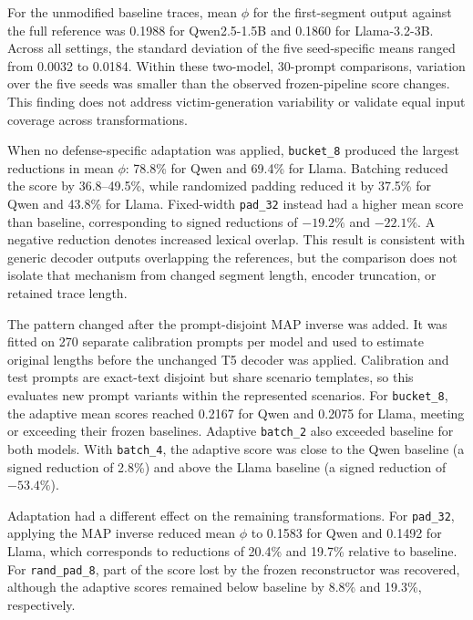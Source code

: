 \documentclass[electronics,article,submit,pdftex,moreauthors]{Definitions/mdpi}
\begin{document}
For the unmodified baseline traces, mean $\phi$ for the first-segment output against the full reference was 0.1988 for Qwen2.5-1.5B and 0.1860 for Llama-3.2-3B. Across all settings, the standard deviation of the five seed-specific means ranged from 0.0032 to 0.0184. Within these two-model, 30-prompt comparisons, variation over the five seeds was smaller than the observed frozen-pipeline score changes. This finding does not address victim-generation variability or validate equal input coverage across transformations.

When no defense-specific adaptation was applied, \texttt{bucket\_8} produced the largest reductions in mean $\phi$: 78.8\% for Qwen and 69.4\% for Llama. Batching reduced the score by 36.8--49.5\%, while randomized padding reduced it by 37.5\% for Qwen and 43.8\% for Llama. Fixed-width \texttt{pad\_32} instead had a higher mean score than baseline, corresponding to signed reductions of $-19.2\%$ and $-22.1\%$. A negative reduction denotes increased lexical overlap. This result is consistent with generic decoder outputs overlapping the references, but the comparison does not isolate that mechanism from changed segment length, encoder truncation, or retained trace length.

The pattern changed after the prompt-disjoint MAP inverse was added. It was fitted on 270 separate calibration prompts per model and used to estimate original lengths before the unchanged T5 decoder was applied. Calibration and test prompts are exact-text disjoint but share scenario templates, so this evaluates new prompt variants within the represented scenarios. For \texttt{bucket\_8}, the adaptive mean scores reached 0.2167 for Qwen and 0.2075 for Llama, meeting or exceeding their frozen baselines. Adaptive \texttt{batch\_2} also exceeded baseline for both models. With \texttt{batch\_4}, the adaptive score was close to the Qwen baseline (a signed reduction of 2.8\%) and above the Llama baseline (a signed reduction of $-53.4\%$).

Adaptation had a different effect on the remaining transformations. For \texttt{pad\_32}, applying the MAP inverse reduced mean $\phi$ to 0.1583 for Qwen and 0.1492 for Llama, which corresponds to reductions of 20.4\% and 19.7\% relative to baseline. For \texttt{rand\_pad\_8}, part of the score lost by the frozen reconstructor was recovered, although the adaptive scores remained below baseline by 8.8\% and 19.3\%, respectively.
\end{document}
